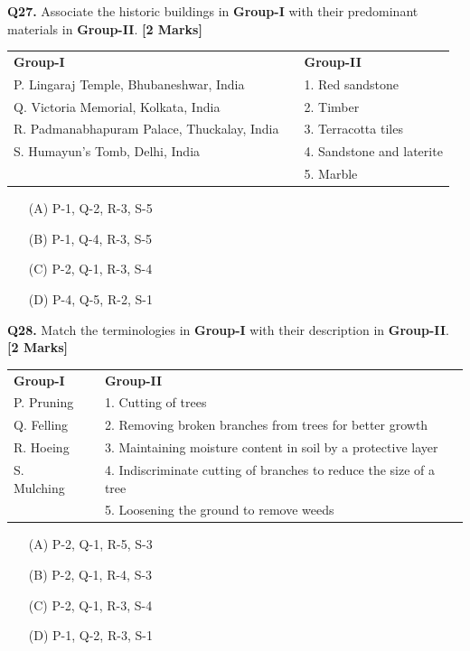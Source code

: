 \documentclass[11pt]{article}
\newcommand{\questionb}[2]{
    \noindent\textbf{Q#2.} #1 \hfill \textbf{[2 Marks]}
}
\begin{document}
\vspace{0.5cm}

\questionb{Associate the historic buildings in \textbf{Group-I} with their predominant materials in \textbf{Group-II}.}{27}

\begin{tabularx}{\linewidth}{lXl}
\textbf{Group-I} & & \textbf{Group-II} \\
P. Lingaraj Temple, Bhubaneshwar, India & & 1. Red sandstone \\
Q. Victoria Memorial, Kolkata, India & & 2. Timber \\
R. Padmanabhapuram Palace, Thuckalay, India & & 3. Terracotta tiles \\
S. Humayun's Tomb, Delhi, India & & 4. Sandstone and laterite \\
& & 5. Marble \\
\end{tabularx}

\begin{enumerate}
    \item[(A)] P-1, Q-2, R-3, S-5
    \item[(B)] P-1, Q-4, R-3, S-5  
    \item[(C)] P-2, Q-1, R-3, S-4
    \item[(D)] P-4, Q-5, R-2, S-1
\end{enumerate}

\vspace{0.5cm}

\questionb{Match the terminologies in \textbf{Group-I} with their description in \textbf{Group-II}.}{28}

\begin{tabularx}{\linewidth}{lXl}
\textbf{Group-I} & & \textbf{Group-II} \\
P. Pruning & & 1. Cutting of trees \\
Q. Felling & & 2. Removing broken branches from trees for better growth \\
R. Hoeing & & 3. Maintaining moisture content in soil by a protective layer \\
S. Mulching & & 4. Indiscriminate cutting of branches to reduce the size of a tree \\
& & 5. Loosening the ground to remove weeds \\
\end{tabularx}

\begin{enumerate}
    \item[(A)] P-2, Q-1, R-5, S-3
    \item[(B)] P-2, Q-1, R-4, S-3  
    \item[(C)] P-2, Q-1, R-3, S-4
    \item[(D)] P-1, Q-2, R-3, S-1
\end{enumerate}
\end{document}
